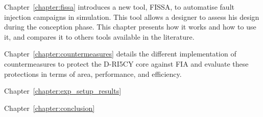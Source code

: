 Chapter~\ref{chapter:fissa} introduces a new tool, FISSA, to automatise fault injection campaigns in simulation. This tool allows a designer to assess his design during the conception phase. This chapter presents how it works and how to use it, and compares it to others tools available in the literature.

Chapter~\ref{chapter:countermeasures} details the different implementation of countermeasures to protect the D-RI5CY core against FIA and evaluate these protections in terms of area, performance, and efficiency.

Chapter~\ref{chapter:exp_setup_results}

Chapter~\ref{chapter:conclusion}


